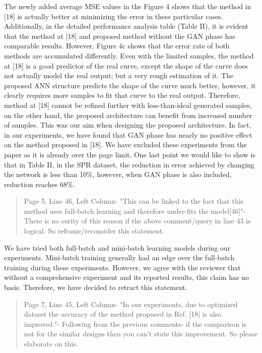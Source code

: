 \documentclass{article}
\begin{document}
	The newly added average MSE values in the Figure 4 shows that the method in [18] is actually better at minimizing the error in these particular cases. Additionally, in the detailed performance analysis table (Table II), it is evident that the method at [18] and proposed method without the GAN phase has comparable results. However, Figure 4c shows that the error rate of both methods are accumulated differently. Even with the limited samples, the method at [18] is a good predictor of the real curve, except the shape of the curve does not actually model the real output; but a very rough estimation of it. The proposed ANN structure predicts the shape of the curve much better, however, it clearly requires more samples to fit that curve to the real output. Therefore, method at [18] cannot be refined further with less-than-ideal generated samples, on the other hand, the proposed architecture can benefit from increased number of samples. This was our aim when designing the proposed architecture. In fact, in our experiments, we have found that GAN phase has nearly no positive effect on the method proposed in [18]. We have excluded these experiments from the paper as it is already over the page limit. One last point we would like to show is that in Table II, in the SPR dataset, the reduction in error achieved by changing the network is less than 10\%, however, when GAN phase is also included, reduction reaches 68\%.
	
	
	\begin{quote}
	Page 5, Line 46, Left Column- "This can be linked to the fact that this method uses full-batch learning and therefore under-fits the model[46]"- There is no surity of this reason if the above comment/query in line 43 is logical. So reframe/reconsider this statement.
	\end{quote}
	
	We have tried both full-batch and mini-batch learning models during our experiments. Mini-batch training generally had an edge over the full-batch training during these experiments. However, we agree with the reviewer that without a comprehensive experiment and its reported results, this claim has no basis. Therefore, we have decided to retract this statement.
	
	\begin{quote}
	Page 7, Line 45, Left Column- "In our experiments, due to optimized dataset the accuracy of the method proposed in Ref. [18] is also improved."- Following from the previous comments- if the comparison is not for the similar designs then you can't state this improvement. So please elaborate on this.
	\end{quote}
	
\end{document}
